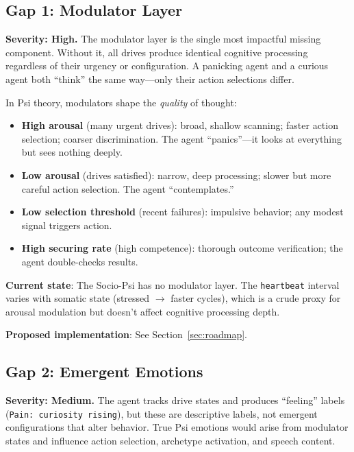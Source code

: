 \documentclass[11pt,letterpaper]{article}
\begin{document}
\subsection{Gap 1: Modulator Layer}

\begin{gapbox}
\textbf{Severity: High.} The modulator layer is the single most impactful
missing component. Without it, all drives produce identical cognitive
processing regardless of their urgency or configuration. A panicking agent
and a curious agent both ``think'' the same way---only their action
selections differ.
\end{gapbox}

In Psi theory, modulators shape the \emph{quality} of thought:

\begin{itemize}
  \item \textbf{High arousal} (many urgent drives): broad, shallow scanning;
    faster action selection; coarser discrimination. The agent ``panics''---it
    looks at everything but sees nothing deeply.
  \item \textbf{Low arousal} (drives satisfied): narrow, deep processing;
    slower but more careful action selection. The agent ``contemplates.''
  \item \textbf{Low selection threshold} (recent failures): impulsive
    behavior; any modest signal triggers action.
  \item \textbf{High securing rate} (high competence): thorough outcome
    verification; the agent double-checks results.
\end{itemize}

\textbf{Current state}: The Socio-Psi has no modulator layer. The
\texttt{heartbeat} interval varies with somatic state (stressed
$\rightarrow$ faster cycles), which is a crude proxy for arousal modulation
but doesn't affect cognitive processing depth.

\textbf{Proposed implementation}: See Section~\ref{sec:roadmap}.

\subsection{Gap 2: Emergent Emotions}

\begin{gapbox}
\textbf{Severity: Medium.} The agent tracks drive states and produces
``feeling'' labels (\texttt{Pain: curiosity rising}), but these are
descriptive labels, not emergent configurations that alter behavior. True
Psi emotions would arise from modulator states and influence action
selection, archetype activation, and speech content.
\end{gapbox}
\end{document}
